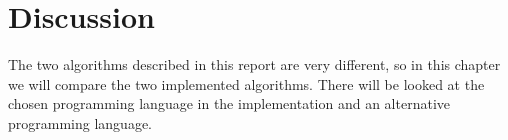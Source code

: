 \chapter{Discussion}
\emptyTop{}
The two algorithms described in this report are very different, so in this chapter we will compare the two implemented algorithms.
There will be looked at the chosen programming language in the implementation and an alternative programming language.






